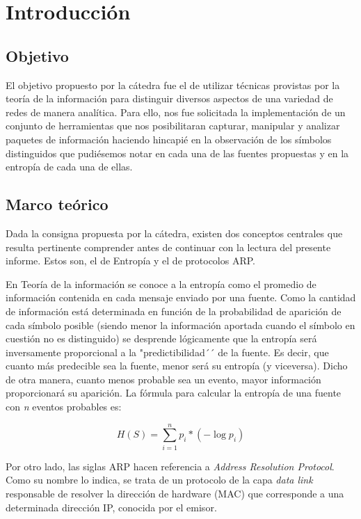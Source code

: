 \section{Introducción}



\subsection{Objetivo}

El objetivo propuesto por la cátedra fue el de utilizar técnicas provistas por la teoría de la información para distinguir
diversos aspectos de una variedad de redes de manera analítica. 
Para ello, nos fue solicitada la implementación de un conjunto de herramientas que nos posibilitaran capturar, manipular y analizar paquetes de información haciendo hincapié en la observación de los símbolos distinguidos que pudiésemos notar en cada una de las fuentes propuestas y en la entropía de cada una de ellas.

\subsection{Marco teórico}

Dada la consigna propuesta por la cátedra, existen dos conceptos centrales que resulta pertinente comprender antes de continuar con la lectura del presente informe. Estos son, el de Entropía y el de protocolos ARP.

En Teoría de la información se conoce a la entropía como el promedio de información contenida en cada mensaje enviado por una fuente. 
Como la cantidad de información está determinada en función de la probabilidad de aparición de cada símbolo posible (siendo menor la información aportada cuando el símbolo en cuestión no es distinguido) se desprende lógicamente que la entropía será inversamente proporcional a la "predictibilidad´´  de la fuente. Es decir, que cuanto más predecible sea la fuente, menor será su entropía (y viceversa).
Dicho de otra manera, cuanto menos probable sea un evento, mayor información proporcionará su aparición.
 La fórmula para calcular la entropía de una fuente con \textit{n} eventos probables es:

 $$H(S) = \sum \limits_{i=1}^n p_i * (- \log{p_i})$$
 \newline

Por otro lado, las siglas ARP hacen referencia a \textit{Address Resolution Protocol}. Como su nombre lo indica, se trata de un protocolo de la capa \textit{data link} responsable de resolver la dirección de hardware (MAC) que corresponde a una determinada dirección IP, conocida por el emisor.

